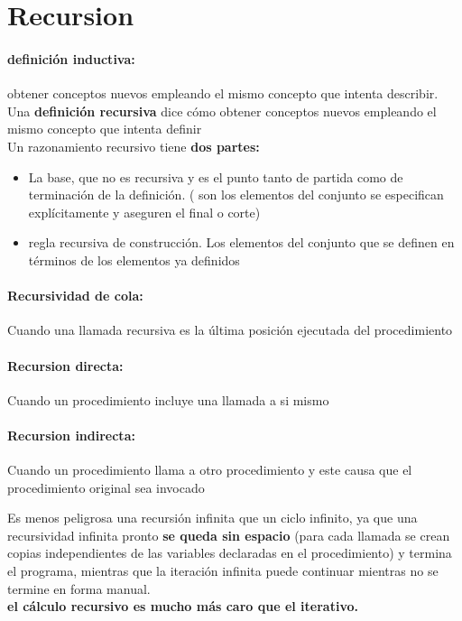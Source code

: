 \documentclass[10pt]{article}
\begin{document}
 
\maketitle

\section{Recursion}

\paragraph{definición inductiva: } obtener conceptos nuevos empleando el 
mismo concepto que intenta describir.\\

Una \textbf{definición recursiva} dice cómo obtener conceptos
nuevos empleando el mismo concepto que intenta definir\\

Un razonamiento recursivo tiene \textbf{dos partes:} 
\begin{itemize}
	\item  La base, que no es recursiva y es el punto tanto de partida como de terminación de la definición. ( son los elementos del conjunto se especifican explícitamente y aseguren el final o corte)
	\item regla recursiva de construcción. Los elementos del conjunto que se definen en términos
de los elementos ya definidos
\end{itemize}

\paragraph{Recursividad de cola: } Cuando una llamada recursiva es la última posición ejecutada
del procedimiento

\paragraph{Recursion directa: }Cuando un procedimiento incluye una llamada a si mismo

\paragraph{Recursion indirecta: }Cuando un procedimiento llama a otro procedimiento y este
causa que el procedimiento original sea invocado

Es menos peligrosa una recursión infinita que un ciclo infinito,
ya que una recursividad infinita pronto \textbf{se queda sin espacio} (para cada llamada se 
crean copias independientes de las variables declaradas en el procedimiento) y termina el
programa, mientras que la iteración infinita puede continuar mientras no se termine en forma manual.\\
\textbf{el cálculo recursivo es mucho más caro que el iterativo.}\\
\linebreak
\end{document}
